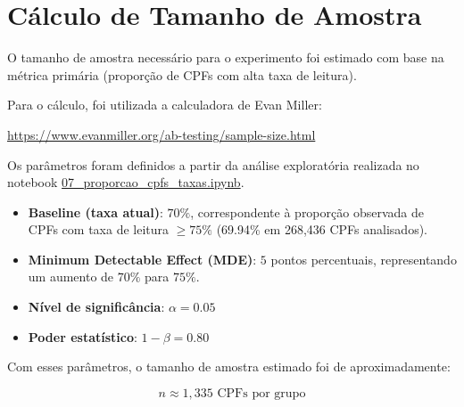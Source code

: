 \section{Cálculo de Tamanho de Amostra}

O tamanho de amostra necessário para o experimento foi estimado com base na métrica primária (proporção de CPFs com alta taxa de leitura).

Para o cálculo, foi utilizada a calculadora de Evan Miller:

\url{https://www.evanmiller.org/ab-testing/sample-size.html}

Os parâmetros foram definidos a partir da análise exploratória realizada no notebook \url{07_proporcao_cpfs_taxas.ipynb}.

\begin{itemize}
    \item \textbf{Baseline (taxa atual)}: $70\%$, correspondente à proporção observada de CPFs com taxa de leitura $\geq 75\%$ (69.94\% em 268{,}436 CPFs analisados).

    \item \textbf{Minimum Detectable Effect (MDE)}: $5$ pontos percentuais, representando um aumento de $70\%$ para $75\%$.

    \item \textbf{Nível de significância}: $\alpha = 0.05$

    \item \textbf{Poder estatístico}: $1 - \beta = 0.80$
\end{itemize}

Com esses parâmetros, o tamanho de amostra estimado foi de aproximadamente:

\[
n \approx 1{,}335 \text{ CPFs por grupo}
\]
